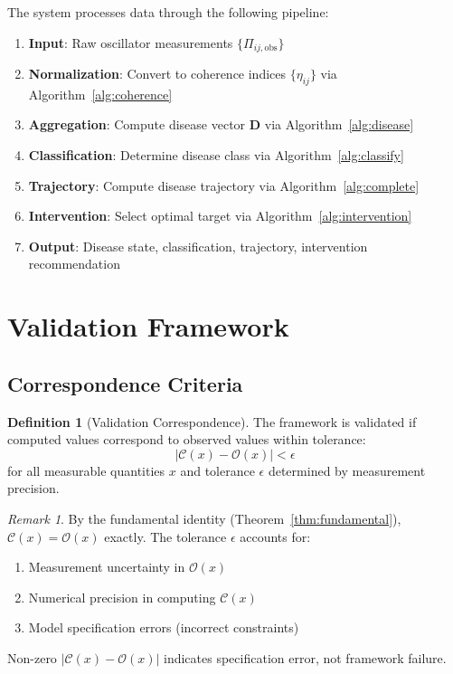 \documentclass[10pt,twocolumn]{article}
\theoremstyle{plain}
\theoremstyle{definition}
\newtheorem{definition}[theorem]{Definition}
\theoremstyle{remark}
\newtheorem{remark}[theorem]{Remark}
\newcommand{\Obs}{\mathcal{O}}
\newcommand{\Comp}{\mathcal{C}}
\newcommand{\Dvec}{\mathbf{D}}
\begin{document}
The system processes data through the following pipeline:

\begin{enumerate}[label=\arabic*.]
\item \textbf{Input}: Raw oscillator measurements $\{\Pi_{ij,\mathrm{obs}}\}$
\item \textbf{Normalization}: Convert to coherence indices $\{\eta_{ij}\}$ via Algorithm~\ref{alg:coherence}
\item \textbf{Aggregation}: Compute disease vector $\Dvec$ via Algorithm~\ref{alg:disease}
\item \textbf{Classification}: Determine disease class via Algorithm~\ref{alg:classify}
\item \textbf{Trajectory}: Compute disease trajectory via Algorithm~\ref{alg:complete}
\item \textbf{Intervention}: Select optimal target via Algorithm~\ref{alg:intervention}
\item \textbf{Output}: Disease state, classification, trajectory, intervention recommendation
\end{enumerate}

\section{Validation Framework}
\label{sec:validation}

\subsection{Correspondence Criteria}

\begin{definition}[Validation Correspondence]
\label{def:correspondence}
The framework is validated if computed values correspond to observed values within tolerance:
\begin{equation}
|\Comp(x) - \Obs(x)| < \epsilon
\label{eq:correspondence}
\end{equation}
for all measurable quantities $x$ and tolerance $\epsilon$ determined by measurement precision.
\end{definition}

\begin{remark}
By the fundamental identity (Theorem~\ref{thm:fundamental}), $\Comp(x) = \Obs(x)$ exactly. The tolerance $\epsilon$ accounts for:
\begin{enumerate}[label=(\roman*)]
\item Measurement uncertainty in $\Obs(x)$
\item Numerical precision in computing $\Comp(x)$
\item Model specification errors (incorrect constraints)
\end{enumerate}
Non-zero $|\Comp(x) - \Obs(x)|$ indicates specification error, not framework failure.
\end{remark}
\end{document}
